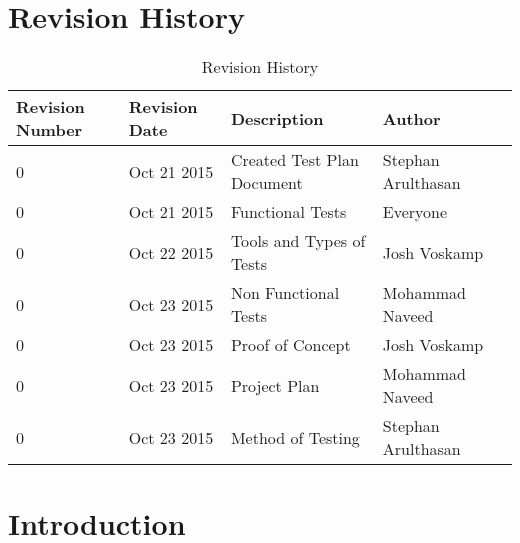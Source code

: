 \documentclass[12pt]{article}
\begin{document}
\begin{titlepage}



\vfill %

\end{titlepage}

\newpage
\tableofcontents
\newpage
\listoftables
{}
\newpage
\listoffigures
{}
\newpage

\section*{Revision History}
\begin{table}[!htbp]
	\centering
    \begin{tabular}{ | p{2cm} | l| l | l |p{3cm}|}
    \hline
    Revision Number & Revision Date & Description & Author \\ \hline
    0 & Oct 21 2015 & Created Test Plan Document & Stephan Arulthasan \\ \hline
    0 & Oct 21 2015 & Functional Tests & Everyone \\ \hline
    0 & Oct 22 2015 & Tools and Types of Tests & Josh Voskamp \\ \hline
    0 & Oct 23 2015 & Non Functional Tests & Mohammad Naveed \\ \hline
    0 & Oct 23 2015 & Proof of Concept & Josh Voskamp \\ \hline
    0 & Oct 23 2015 & Project Plan & Mohammad Naveed \\ \hline
    0 & Oct 23 2015 & Method of Testing & Stephan Arulthasan \\ \hline

    \end{tabular}
    \caption{Revision History}
\end{table}


\newpage

\section{Introduction}
\end{document}
